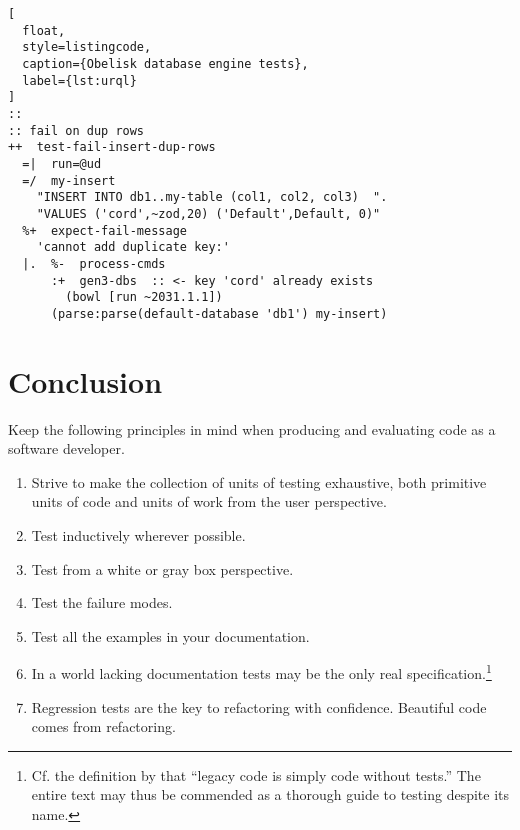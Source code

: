 \documentclass[twoside]{article}
\begin{document}
\begin{lstlisting}[
  float,
  style=listingcode,
  caption={Obelisk database engine tests},
  label={lst:urql}
]
::
:: fail on dup rows
++  test-fail-insert-dup-rows
  =|  run=@ud
  =/  my-insert
    "INSERT INTO db1..my-table (col1, col2, col3)  ".
    "VALUES ('cord',~zod,20) ('Default',Default, 0)"
  %+  expect-fail-message
    'cannot add duplicate key:'
  |.  %-  process-cmds
      :+  gen3-dbs  :: <- key 'cord' already exists
        (bowl [run ~2031.1.1])
      (parse:parse(default-database 'db1') my-insert)
\end{lstlisting}

\section{Conclusion}

Keep the following principles in mind when producing and evaluating code as a software developer.

\begin{enumerate}
  \item  Strive to make the collection of units of testing exhaustive, both primitive units of code and units of work from the user perspective.
  \item  Test inductively wherever possible.
  \item  Test from a white or gray box perspective.
  \item  Test the failure modes.
  \item  Test all the examples in your documentation.
  \item  In a world lacking documentation tests may be the only real specification.\footnote{Cf. the definition by \citeauthor[p. xvi]{Feathers2005} that “legacy code is simply code without tests.”  The entire text may thus be commended as a thorough guide to testing despite its name.}
  \item  Regression tests are the key to refactoring with confidence. Beautiful code comes from refactoring.  \tombstone{}
\end{enumerate}

\printbibliography
\end{document}
